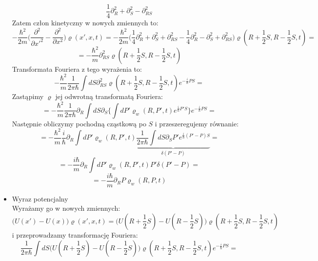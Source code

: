 \begin{itemize}
\begin{equation}
\frac{1}{4}\partial_R^2+
\partial_S^2-{\partial_{RS}^2}
\end{equation}
Zatem człon kinetyczny w nowych zmiennych to:
\begin{equation}
-\frac{\hbar^2}{2m}\Big(\frac{\partial^2}{\partial x'^2}-\frac{\partial^2}{\partial x^2}\Big)\varrho(x',x,t)=
-\frac{\hbar^2}{2m}\Big(\frac{1}{4}\partial_R^2+
\partial_S^2+{\partial_{RS}^2}-\frac{1}{4}\partial_R^2-
\partial_S^2+{\partial_{RS}^2}\Big)\varrho(R+\frac{1}{2}S,R-\frac{1}{2}S,t)=
\nonumber
\end{equation}
\begin{equation}
=-\frac{\hbar^2}{m}\partial_{RS}^2\varrho(R+\frac{1}{2}S,R-\frac{1}{2}S,t)
\end{equation}
Transformata Fouriera z tego wyrażenia to:
\begin{equation}
-\frac{\hbar^2}{m}\frac{1}{2\pi\hbar}\int dS \partial_{RS}^2\varrho(R+\frac{1}{2}S,R-\frac{1}{2}S,t)e^{-\frac{i}{\hbar}PS}=\nonumber
\end{equation}
Zastąpimy $\varrho$ jej odwrotną transformatą Fouriera:
\begin{equation}
=-\frac{\hbar^2}{m}\frac{1}{2\pi\hbar}\partial_R\int dS \partial_S\Big\lbrace
\int dP'\varrho_w(R,P',t)e^{\frac{i}{\hbar}P'S}\Big\rbrace e^{-\frac{i}{\hbar}PS}=
\nonumber
\end{equation}
Następnie obliczymy pochodną cząstkową po $S$ i przeszeregujemy równanie:
\begin{equation}
=-\frac{\hbar^2}{m}\frac{i}{\hbar}\partial_R\int dP'\varrho_w(R,P',t)
\underbrace{\frac{1}{2\pi\hbar}
\int dS \partial_S P'
e^{\frac{i}{\hbar}(P'-P)S}}_{\delta(P'-P)}=
\nonumber
\end{equation}
\begin{equation}
=-\frac{i\hbar}{m}\partial_R\int dP'\varrho_w(R,P',t)P'\delta(P'-P)=
\nonumber
\end{equation}
\begin{equation}
=-\frac{i\hbar}{m}\partial_R P\varrho_w(R,P,t)
\end{equation}
\item Wyraz potencjalny\\
Wyrażamy go w nowych zmiennych:
\begin{equation}
\Big(U(x')-U(x)\Big)\varrho(x',x,t)=
\Big(U(R+\frac{1}{2}S)-U(R-\frac{1}{2}S)\Big)\varrho(R+\frac{1}{2}S,R-\frac{1}{2}S,t)
\end{equation}
i przeprowadzamy transformację Fouriera:
\begin{equation}\frac{1}{2\pi\hbar}\int dS\Big(U(R+\frac{1}{2}S)-U(R-\frac{1}{2}S)\Big)\varrho(R+\frac{1}{2}S,R-\frac{1}{2}S,t)e^{-\frac{i}{\hbar}PS}=

\end{equation}
\end{itemize}
